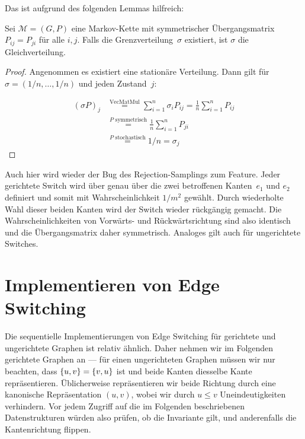 Das ist aufgrund des folgenden Lemmas hilfreich:
\begin{lemma}
    Sei $\mathcal M = (G, P)$ eine Markov-Kette mit symmetrischer Übergangsmatrix $P_{ij} = P_{ji}$ für alle $i, j$.
    Falls die Grenzverteilung~$\sigma$ existiert, ist $\sigma$ die Gleichverteilung.
\end{lemma}

\begin{proof}
    Angenommen es existiert eine stationäre Verteilung.
    Dann gilt für $\sigma = (1/n, \ldots, 1/n)$ und jeden Zustand~$j$:

    \begin{align}
        (\sigma P) _ j & \stackrel{\text{VecMatMul}}{=} \sum_{i=1}^n \sigma_i P_{ij}
        = \frac 1 n \sum_{i=1}^n P_{ij}                                                   \\
                       & \stackrel{P\text{ symmetrisch}}{=} \frac 1 n \sum_{i=1}^n P_{ji} \\
                       & \stackrel{P\text{ stochastisch}}{=} 1 / n = \sigma_j
    \end{align}
\end{proof}

Auch hier wird wieder der Bug des Rejection-Samplings zum Feature.
Jeder gerichtete Switch wird über genau über die zwei betroffenen Kanten~$e_1$ und $e_2$ definiert und somit mit Wahrscheinlichkeit $1/m^2$ gewählt.
Durch wiederholte Wahl dieser beiden Kanten wird der Switch wieder rückgängig gemacht.
Die Wahrscheinlichkeiten von Vorwärts- und Rückwärtsrichtung sind also identisch und die Übergangsmatrix daher symmetrisch.
Analoges gilt auch für ungerichtete Switches.

\section{Implementieren von Edge Switching}
Die sequentielle Implementierungen von Edge Switching für gerichtete und ungerichtete Graphen ist relativ ähnlich.
Daher nehmen wir im Folgenden gerichtete Graphen an --- für einen ungerichteten Graphen müssen wir nur beachten, dass $\left\{u, v\right\} = \left\{v, u\right\}$ ist und beide Kanten diesselbe Kante repräsentieren.
Üblicherweise repräsentieren wir beide Richtung durch eine kanonische Repräsentation $(u, v)$, wobei wir \zB durch $u \le v$ Uneindeutigkeiten verhindern.
Vor jedem Zugriff auf die im Folgenden beschriebenen Datenstrukturen würden also prüfen, ob die Invariante gilt, und anderenfalls die Kantenrichtung flippen.


